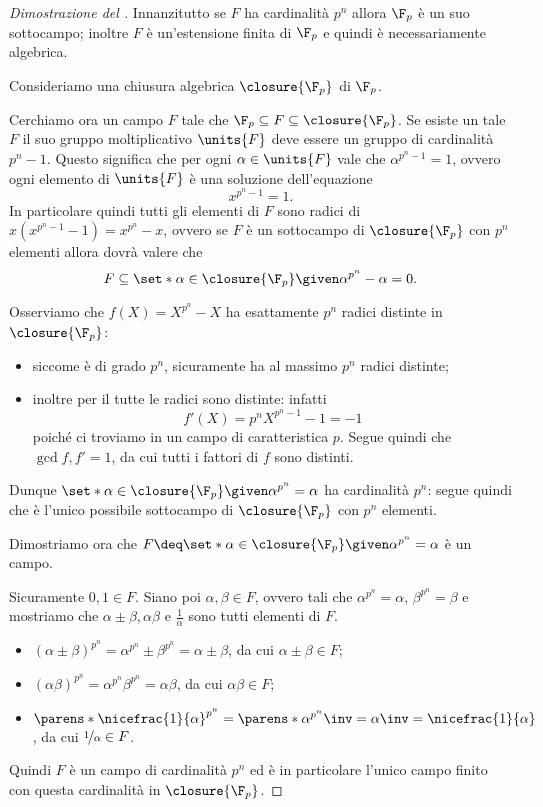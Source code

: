 \begin{proof}
    [Dimostrazione del ]
    Innanzitutto se $F$ ha cardinalità $p^n$ allora $\F_p$ è un suo sottocampo; inoltre $F$ è un'estensione finita di $\F_p$ e quindi è necessariamente algebrica.

    Consideriamo una chiusura algebrica $\closure{\F_p}$ di $\F_p$.

    Cerchiamo ora un campo $F$ tale che $\F_p \subseteq F \subseteq \closure {\F_p}$. Se esiste un tale $F$ il suo gruppo moltiplicativo $\units{F}$ deve essere un gruppo di cardinalità $p^n - 1$. Questo significa che per ogni $\alpha \in \units{F}$ vale che $\alpha^{p^n - 1} = 1$, ovvero ogni elemento di $\units{F}$ è una soluzione dell'equazione \[
        x^{p^n - 1} = 1.    
    \] In particolare quindi tutti gli elementi di $F$ sono radici di $x(x^{p^n - 1} - 1) = x^{p^n} - x$, ovvero se $F$ è un sottocampo di $\closure{\F_p}$ con $p^n$ elementi allora dovrà valere che \[
        F \subseteq \set*{\alpha \in \closure{\F_p} \given \alpha^{p^n} - \alpha = 0}.
    \]

    Osserviamo che $f(X) = X^{p^n} - X$ ha esattamente $p^n$ radici distinte in $\closure{\F_p}$:
    \begin{itemize}
        \item siccome è di grado $p^n$, sicuramente ha al massimo $p^n$ radici distinte;
        \item inoltre per il  tutte le radici sono distinte: infatti \[
            f'(X) = p^nX^{p^n - 1} - 1 = -1  
        \] poiché ci troviamo in un campo di caratteristica $p$. Segue quindi che $\gcd{f, f'} = 1$, da cui tutti i fattori di $f$ sono distinti.
    \end{itemize}
    Dunque $\set*{\alpha \in \closure{\F_p} \given \alpha^{p^n} = \alpha}$ ha cardinalità $p^n$: segue quindi che è l'unico possibile sottocampo di $\closure{\F_p}$ con $p^n$ elementi.

    Dimostriamo ora che $F \deq \set*{\alpha \in \closure{\F_p} \given \alpha^{p^n} = \alpha}$ è un campo. 
    
    Sicuramente $0, 1 \in F$. Siano poi $\alpha, \beta \in F$, ovvero tali che $\alpha^{p^n} = \alpha$, $\beta^{p^n} = \beta$ e mostriamo che $\alpha \pm \beta, \alpha\beta$ e $\frac{1}{\alpha}$ sono tutti elementi di $F$.
    \begin{itemize}
        \item $(\alpha \pm \beta)^{p^n} = \alpha^{p^n} \pm \beta^{p^n} = \alpha \pm \beta$, da cui $\alpha \pm \beta \in F$;
        \item $(\alpha\beta)^{p^n} = \alpha^{p^n}\beta^{p^n} = \alpha\beta$, da cui $\alpha\beta \in F$;
        \item $\parens*{\nicefrac{1}{\alpha}}^{p^n} = \parens*{\alpha^{p^n}}\inv = \alpha\inv = \nicefrac{1}{\alpha}$, da cui $\nicefrac{1}{\alpha} \in F$.
    \end{itemize}
    Quindi $F$ è un campo di cardinalità $p^n$ ed è in particolare l'unico campo finito con questa cardinalità in $\closure{\F_p}$.
\end{proof}

